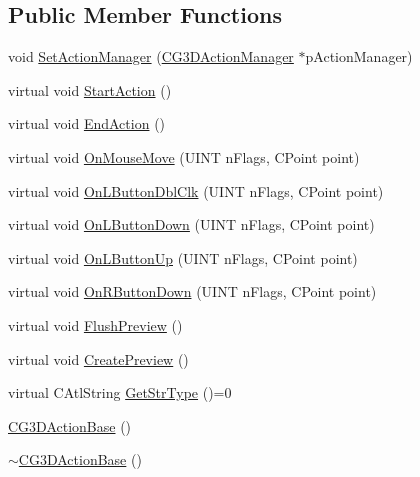 \subsection*{Public Member Functions}
\begin{DoxyCompactItemize}
\item 
void \hyperlink{class_c_g3_d_action_base_a053eead24259ad5a63b70d929f5513c8}{Set\+Action\+Manager} (\hyperlink{class_c_g3_d_action_manager}{C\+G3\+D\+Action\+Manager} $\ast$p\+Action\+Manager)
\item 
virtual void \hyperlink{class_c_g3_d_action_base_afaa3c0d456deadd08cad7e7ea4444a1e}{Start\+Action} ()
\item 
virtual void \hyperlink{class_c_g3_d_action_base_ad1ff5e9a791fd2389d788f1ab954333e}{End\+Action} ()
\item 
virtual void \hyperlink{class_c_g3_d_action_base_a3c7a49e84a681baa6375e28588b8d7f0}{On\+Mouse\+Move} (U\+I\+N\+T n\+Flags, C\+Point point)
\item 
virtual void \hyperlink{class_c_g3_d_action_base_a28ec2ad30b43075a145d6a49bd2510c4}{On\+L\+Button\+Dbl\+Clk} (U\+I\+N\+T n\+Flags, C\+Point point)
\item 
virtual void \hyperlink{class_c_g3_d_action_base_af82093e160d3c737c734d64cc32c84dc}{On\+L\+Button\+Down} (U\+I\+N\+T n\+Flags, C\+Point point)
\item 
virtual void \hyperlink{class_c_g3_d_action_base_aa35957b3bc351a3e4986c00f9a93733c}{On\+L\+Button\+Up} (U\+I\+N\+T n\+Flags, C\+Point point)
\item 
virtual void \hyperlink{class_c_g3_d_action_base_af60805c7f847129a394b13e4f67b5b09}{On\+R\+Button\+Down} (U\+I\+N\+T n\+Flags, C\+Point point)
\item 
virtual void \hyperlink{class_c_g3_d_action_base_ace638af531c9998b13f7f89ee2c84609}{Flush\+Preview} ()
\item 
virtual void \hyperlink{class_c_g3_d_action_base_abfd3bf878d8234a2c839a865637b6514}{Create\+Preview} ()
\item 
virtual C\+Atl\+String \hyperlink{class_c_g3_d_action_base_a1a3715f4dc774020d74347b63e6d60ca}{Get\+Str\+Type} ()=0
\item 
\hyperlink{class_c_g3_d_action_base_a42ab6f22844915186e68254512ea9608}{C\+G3\+D\+Action\+Base} ()
\item 
\hyperlink{class_c_g3_d_action_base_ad54a154ce5a62553d44e738109d9731a}{$\sim$\+C\+G3\+D\+Action\+Base} ()
\end{DoxyCompactItemize}
